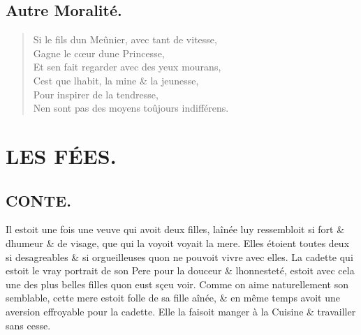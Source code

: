 \documentclass[14pt,a4paper]{memoir}
\begin{document}
\begin{otherlanguage}{french}
\begin{verse}
\end{verse}


\section{Autre Moralité.}

\begin{verse}
  \small
Si le fils d\textquotesingle un Meûnier, avec tant de vitesse,  \\
Gagne le cœur d\textquotesingle une Princesse, \\
Et s\textquotesingle en fait regarder avec des yeux mourans, \\
C\textquotesingle est que l\textquotesingle habit, la mine \& la jeunesse, \\
Pour inspirer de la tendresse, \\
N\textquotesingle en sont pas des moyens toûjours indifférens.

\end{verse}


\chapter{LES FÉES.}

\section{CONTE.}

Il estoit une fois une veuve qui avoit deux filles,
l\textquotesingle aînée luy ressembloit si fort \&
d\textquotesingle humeur \& de visage, que qui la voyoit voyait la mere.
Elles étoient toutes deux si desagreables \& si orgueilleuses
qu\textquotesingle on ne pouvoit vivre avec elles. La cadette qui estoit
le vray portrait de son Pere pour la douceur \&
l\textquotesingle honnesteté, estoit avec cela une des plus belles
filles qu\textquotesingle on eust sçeu voir. Comme on aime naturellement
son semblable, cette mere estoit folle de sa fille aînée, \& en même
temps avoit une aversion effroyable pour la cadette. Elle la faisoit
manger à la Cuisine \& travailler sans cesse.


\end{otherlanguage}
\end{document}
